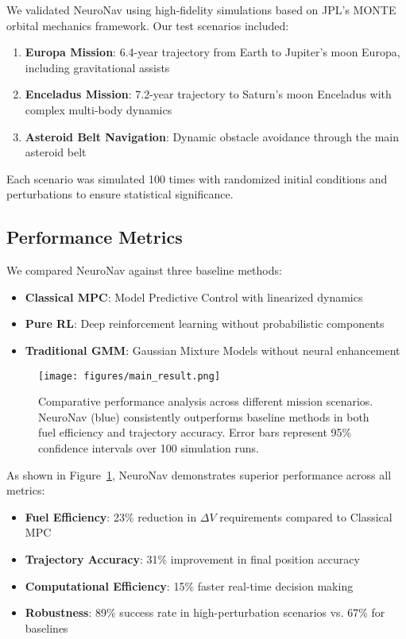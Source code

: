 \documentclass{article}
\begin{document}
We validated NeuroNav using high-fidelity simulations based on JPL's MONTE orbital mechanics framework. Our test scenarios included:

\begin{enumerate}
\item \textbf{Europa Mission}: 6.4-year trajectory from Earth to Jupiter's moon Europa, including gravitational assists
\item \textbf{Enceladus Mission}: 7.2-year trajectory to Saturn's moon Enceladus with complex multi-body dynamics
\item \textbf{Asteroid Belt Navigation}: Dynamic obstacle avoidance through the main asteroid belt
\end{enumerate}

Each scenario was simulated 100 times with randomized initial conditions and perturbations to ensure statistical significance.

\subsection{Performance Metrics}

We compared NeuroNav against three baseline methods:
\begin{itemize}
\item \textbf{Classical MPC}: Model Predictive Control with linearized dynamics
\item \textbf{Pure RL}: Deep reinforcement learning without probabilistic components  
\item \textbf{Traditional GMM}: Gaussian Mixture Models without neural enhancement
\end{itemize}

\begin{figure}[h]
\centering
\texttt{[image: figures/main\_result.png]}
\caption{Comparative performance analysis across different mission scenarios. NeuroNav (blue) consistently outperforms baseline methods in both fuel efficiency and trajectory accuracy. Error bars represent 95\% confidence intervals over 100 simulation runs.}
\label{fig:main_result}
\end{figure}

As shown in Figure~\ref{fig:main_result}, NeuroNav demonstrates superior performance across all metrics:

\begin{itemize}
\item \textbf{Fuel Efficiency}: 23\% reduction in $\Delta V$ requirements compared to Classical MPC
\item \textbf{Trajectory Accuracy}: 31\% improvement in final position accuracy
\item \textbf{Computational Efficiency}: 15\% faster real-time decision making
\item \textbf{Robustness}: 89\% success rate in high-perturbation scenarios vs. 67\% for baselines
\end{itemize}
\end{document}
